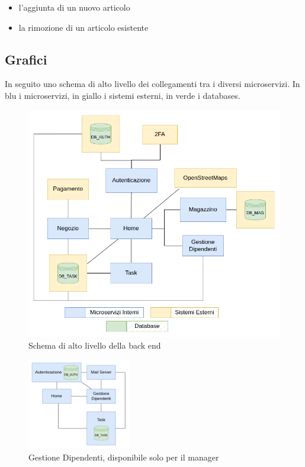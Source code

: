 \documentclass{report}
\begin{document}
\begin{itemize}
	\item l’aggiunta di un nuovo articolo
	
	\item la rimozione di un articolo esistente
\end{itemize}

\subsection{Grafici}

In seguito uno schema di alto livello dei collegamenti tra i diversi microservizi. In blu i microservizi, in giallo i sistemi esterni, in verde i databases.

\begin{figure}[h]
	\centering
	\includegraphics[width=1\textwidth]{images/back_end_short}
	\caption{Schema di alto livello della back end}
\end{figure}	

\iffalse
\begin{figure}[h]
	\centering
	\includegraphics[width=0.4\textwidth]{images/admin_back_end}
	\caption{Gestione Dipendenti, disponibile solo per il manager}
\end{figure}
\end{document}
